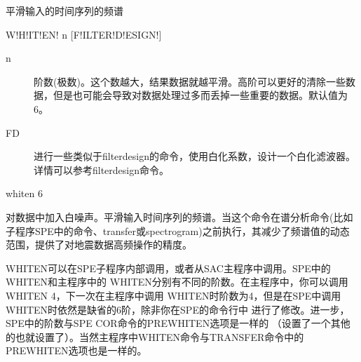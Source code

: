 \label{cmd:whiten}

平滑输入的时间序列的频谱

\begin{SACSTX}
W!H!IT!EN! n [F!ILTER!D!ESIGN!]
\end{SACSTX}

\begin{description}
\item [n]  阶数(极数)。这个数越大，结果数据就越平滑。高阶可以更好的清除一些数据，但是也可能会导致对数据处理过多而丢掉一些重要的数据。默认值为6。
\item [FD] 进行一些类似于filterdesign的命令，使用白化系数，设计一个白化滤波器。详情可以参考filterdesign命令。
\end{description}

\begin{SACDFT}
whiten 6
\end{SACDFT}

对数据中加入白噪声。平滑输入时间序列的频谱。当这个命令在谱分析命令(比如子程序SPE中的命令、transfer或spectrogram)之前执行，其减少了频谱值的动态范围，提供了对地震数据高频操作的精度。

WHITEN可以在SPE子程序内部调用，或者从SAC主程序中调用。SPE中的WHITEN和主程序中的
WHITEN分别有不同的阶数。在主程序中，你可以调用WHITEN 4，下一次在主程序中调用
WHITEN时阶数为4，但是在SPE中调用WHITEN时依然是缺省的6阶，除非你在SPE的命令行中
进行了修改。进一步，SPE中的阶数与SPE COR命令的PREWHITEN选项是一样的
（设置了一个其他的也就设置了）。当然主程序中WHITEN命令与TRANSFER命令中的
PREWHITEN选项也是一样的。

